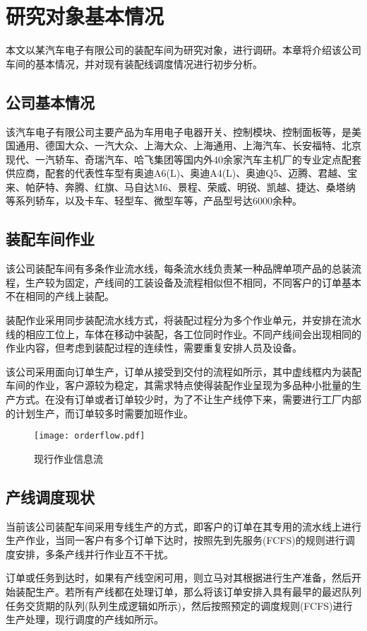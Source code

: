 \chapter{研究对象基本情况}
本文以某汽车电子有限公司的装配车间为研究对象，进行调研。本章将介绍该公司车间的基本情况，并对现有装配线调度情况进行初步分析。
\section{公司基本情况}
该汽车电子有限公司主要产品为车用电子电器开关、控制模块、控制面板等，是美国通用、德国大众、一汽大众、上海大众、上海通用、上海汽车、长安福特、北京现代、一汽轿车、奇瑞汽车、哈飞集团等国内外40余家汽车主机厂的专业定点配套供应商，配套的代表性车型有奥迪A6(L)、奥迪A4(L)、奥迪Q5、迈腾、君越、宝来、帕萨特、奔腾、红旗、马自达M6、景程、荣威、明锐、凯越、捷达、桑塔纳等系列轿车，以及卡车、轻型车、微型车等，产品型号达6000余种。

\section{装配车间作业}
该公司装配车间有多条作业流水线，每条流水线负责某一种品牌单项产品的总装流程，生产较为固定，产线间的工装设备及流程相似但不相同，不同客户的订单基本不在相同的产线上装配。

装配作业采用同步装配流水线方式，将装配过程分为多个作业单元，并安排在流水线的相应工位上，车体在移动中装配，各工位同时作业。不同产线间会出现相同的作业内容，但考虑到装配过程的连续性，需要重复安排人员及设备。

该公司采用面向订单生产，订单从接受到交付的流程如所示，其中虚线框内为装配车间的作业，客户源较为稳定，其需求特点使得装配作业呈现为多品种小批量的生产方式。在没有订单或者订单较少时，为了不让生产线停下来，需要进行工厂内部的计划生产，而订单较多时需要加班作业。
\begin{figure}[h]
\centering
\texttt{[image: orderflow.pdf]}
\caption{现行作业信息流\label{fig:orderflow}}
\end{figure}

\section{产线调度现状}
当前该公司装配车间采用专线生产的方式，即客户的订单在其专用的流水线上进行生产作业，当同一客户有多个订单下达时，按照先到先服务(FCFS)的规则进行调度安排，多条产线并行作业互不干扰。

订单或任务到达时，如果有产线空闲可用，则立马对其根据进行生产准备，然后开始装配生产。若所有产线都在处理订单，那么将该订单安排入具有最早的最迟队列任务交货期的队列(队列生成逻辑如所示)，然后按照预定的调度规则(FCFS)进行生产处理，现行调度的产线如所示。

